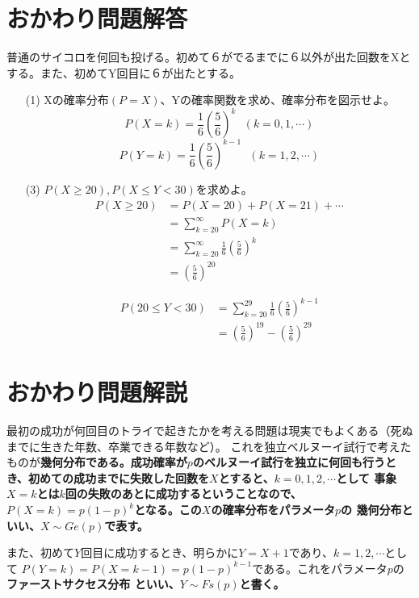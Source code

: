 \documentclass[a4j,uplatex]{jsarticle}
\begin{document}
\section*{おかわり問題解答}
普通のサイコロを何回も投げる。初めて６がでるまでに６以外が出た回数をXとする。また、初めてY回目に６が出たとする。
\begin{itemize}
  \item[(1)] Xの確率分布$(P=X)$、Yの確率関数を求め、確率分布を図示せよ。
  \\ 
  \begin{equation}
    P(X=k)=\frac{1}{6} \left(\frac{5}{6}\right)^{k}~~~(k=0,1,\cdots)
  \end{equation}
  \begin{equation}
    P(Y=k)=\frac{1}{6}\left(\frac{5}{6}\right)^{k-1}~~~(k=1,2,\cdots)
  \end{equation}
  \item[(3)] $ P(X\ge20) , P(X\le Y<30) $を求めよ。 
  \begin{equation}
    \begin{split}
      P(X\ge20)&=P(X=20)+P(X=21)+\cdots \\
      &=\sum_{k=20}^{\infty}P(X=k) \\
      &=\sum_{k=20}^{\infty}\frac{1}{6}\left(\frac{5}{6}\right)^k \\
      &=\left(\frac{5}{6}\right)^{20}
    \end{split}
  \end{equation} 

  \begin{equation}
    \begin{split}
      P(20\le Y<30)&=\sum_{k=20}^{29}\frac{1}{6}\left(\frac{5}{6}\right)^{k-1} \\
      &=\left(\frac{5}{6}\right)^{19} - \left(\frac{5}{6}\right)^{29}
    \end{split}
  \end{equation} 
\end{itemize}

\section*{おかわり問題解説}
最初の成功が何回目のトライで起きたかを考える問題は現実でもよくある（死ぬまでに生きた年数、卒業できる年数など）。
これを独立ベルヌーイ試行で考えたものが\bf 幾何分布\rm である。成功確率が$p$のベルヌーイ試行を独立に何回も行うとき、初めての成功までに失敗した回数を$X$とすると、$ k=0,1,2,\cdots $として
事象$X=k$とは$k$回の失敗のあとに成功するということなので、$ P(X=k)=p(1-p)^k $となる。この$X$の確率分布をパラメータ$p$の
幾何分布といい、$X \sim Ge(p)$で表す。
\par また、初めて$Y$回目に成功するとき、明らかに$Y=X+1$であり、$ k=1,2,\cdots $として
$P(Y=k)=P(X=k-1)=p(1-p)^{k-1}$である。これをパラメータ$p$の\bf ファーストサクセス分布 \rm といい、$Y\sim Fs(p)$と書く。
\end{document}

